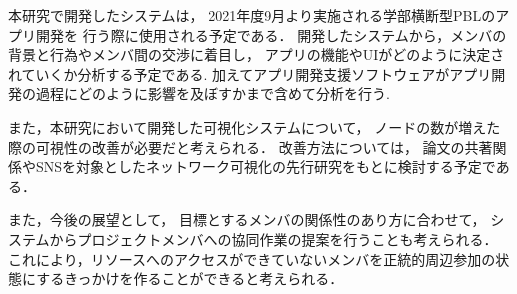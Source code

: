 
本研究で開発したシステムは，
2021年度9月より実施される学部横断型PBLのアプリ開発を
行う際に使用される予定である．
開発したシステムから，メンバの背景と行為やメンバ間の交渉に着目し，
アプリの機能やUIがどのように決定されていくか分析する予定である.
加えてアプリ開発支援ソフトウェアがアプリ開発の過程にどのように影響を及ぼすかまで含めて分析を行う.

また，本研究において開発した可視化システムについて，
ノードの数が増えた際の可視性の改善が必要だと考えられる．
改善方法については，
論文の共著関係やSNSを対象としたネットワーク可視化の先行研究をもとに検討する予定である．

また，今後の展望として，
目標とするメンバの関係性のあり方に合わせて，
システムからプロジェクトメンバへの協同作業の提案を行うことも考えられる．
これにより，リソースへのアクセスができていないメンバを正統的周辺参加の状態にするきっかけを作ることができると考えられる．
